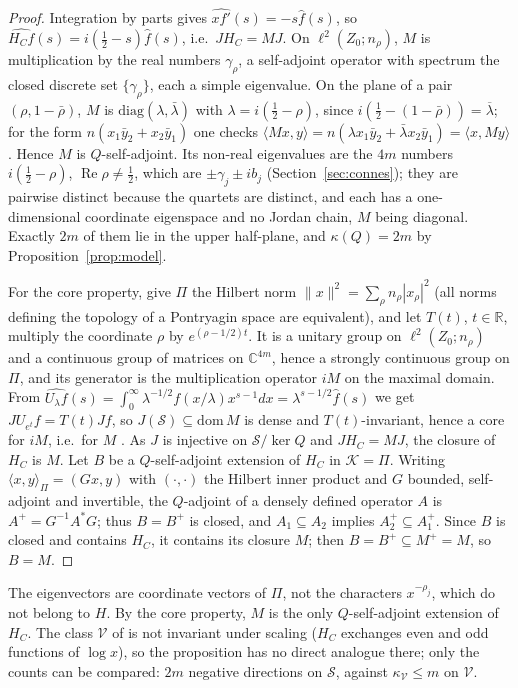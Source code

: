 \documentclass[11pt]{amsart}
\renewcommand{\Re}{\operatorname{Re}}
\newcommand{\kap}{\kappa}
\newcommand{\Kcal}{\mathcal{K}}
\newcommand{\Scal}{\mathcal{S}}
\begin{document}
\begin{proof}
Integration by parts gives $\widehat{xf'}(s)=-s\hat f(s)$, so $\widehat{H_Cf}(s)=i(\tfrac12-s)
\hat f(s)$, i.e.\ $JH_C=MJ$.  On $\ell^2(Z_0;n_\rho)$, $M$ is multiplication by the real numbers
$\gamma_\rho$, a self-adjoint operator with spectrum the closed discrete set
$\{\gamma_\rho\}$, each a simple eigenvalue.  On the plane of a pair $(\rho,1-\bar\rho)$, $M$ is
$\mathrm{diag}(\lambda,\bar\lambda)$ with $\lambda=i(\tfrac12-\rho)$, since
$i(\tfrac12-(1-\bar\rho))=\overline{\lambda}$; for the form $n(x_1\bar y_2+x_2\bar y_1)$ one
checks $\langle Mx,y\rangle=n(\lambda x_1\bar y_2+\bar\lambda x_2\bar y_1)=\langle x,My\rangle$.
Hence $M$ is $Q$-self-adjoint.  Its non-real eigenvalues are the $4m$ numbers
$i(\tfrac12-\rho)$, $\Re\rho\ne\tfrac12$, which are $\pm\gamma_j\pm ib_j$ (Section~\ref{sec:connes});
they are pairwise distinct because the quartets are distinct, and each has a one-dimensional
coordinate eigenspace and no Jordan chain, $M$ being diagonal.  Exactly $2m$ of them lie in the
upper half-plane, and $\kap(Q)=2m$ by Proposition~\ref{prop:model}.

For the core property, give $\Pi$ the Hilbert norm $\|x\|^2=\sum_\rho n_\rho|x_\rho|^2$ (all
norms defining the topology of a Pontryagin space are equivalent), and let $T(t)$, $t\in\mathbb R$,
multiply the coordinate $\rho$ by $e^{(\rho-1/2)t}$.  It is a unitary group on
$\ell^2(Z_0;n_\rho)$ and a continuous group of matrices on $\mathbb C^{4m}$, hence a strongly
continuous group on $\Pi$, and its generator is the multiplication operator $iM$ on the maximal
domain.  From $\widehat{U_\lambda f}(s)=\int_0^\infty\lambda^{-1/2}f(x/\lambda)x^{s-1}dx
=\lambda^{s-1/2}\hat f(s)$ we get $JU_{e^t}f=T(t)Jf$, so $J(\Scal)\subseteq\mathrm{dom}\,M$ is
dense and $T(t)$-invariant, hence a core for $iM$, i.e.\ for $M$ \cite[Prop.~II.1.7]{EngelNagel}.
As $J$ is injective on $\Scal/\ker Q$ and $JH_C=MJ$, the closure of $H_C$ is $M$.  Let $B$ be a
$Q$-self-adjoint extension of $H_C$ in $\Kcal=\Pi$.  Writing $\langle x,y\rangle_\Pi=(Gx,y)$ with
$(\cdot,\cdot)$ the Hilbert inner product and $G$ bounded, self-adjoint and invertible, the
$Q$-adjoint of a densely defined operator $A$ is $A^+=G^{-1}A^*G$; thus $B=B^+$ is closed, and
$A_1\subseteq A_2$ implies $A_2^+\subseteq A_1^+$.  Since $B$ is closed and contains $H_C$, it
contains its closure $M$; then $B=B^+\subseteq M^+=M$, so $B=M$.
\end{proof}

The eigenvectors are coordinate vectors of $\Pi$, not the characters $x^{-\rho_j}$, which do
not belong to $H$.  By the core property, $M$ is the only $Q$-self-adjoint extension of
$H_C$.  The class $\mathcal V$ of \cite{Index} is not invariant under scaling
($H_C$ exchanges even and odd functions of $\log x$), so the proposition has no direct analogue
there; only the counts can be compared: $2m$ negative directions on $\Scal$, against
$\kap_{\mathcal V}\le m$ on $\mathcal V$.
\end{document}
